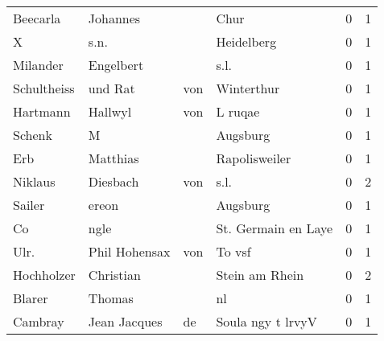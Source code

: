 \begin{tabular}{llllrr}
                 Beecarla &                           Johannes &             &                                        Chur &          0 &         1 \\
                        X &                               s.n. &             &                                  Heidelberg &          0 &         1 \\
                 Milander &                          Engelbert &             &                                        s.l. &          0 &         1 \\
              Schultheiss &                            und Rat &         von &                                  Winterthur &          0 &         1 \\
                 Hartmann &                            Hallwyl &         von &                                     L ruqae &          0 &         1 \\
                   Schenk &                                  M &             &                                    Augsburg &          0 &         1 \\
                      Erb &                           Matthias &             &                               Rapolisweiler &          0 &         1 \\
                  Niklaus &                           Diesbach &         von &                                        s.l. &          0 &         2 \\
                   Sailer &                              ereon &             &                                    Augsburg &          0 &         1 \\
                       Co &                               ngle &             &                         St. Germain en Laye &          0 &         1 \\
                     Ulr. &                     Phil  Hohensax &         von &                                      To vsf &          0 &         1 \\
               Hochholzer &                          Christian &             &                              Stein am Rhein &          0 &         2 \\
                   Blarer &                             Thomas &             &                                          nl &          0 &         1 \\
                  Cambray &                       Jean Jacques &          de &                           Soula ngy t lrvyV &          0 &         1 \\

\end{tabular}
